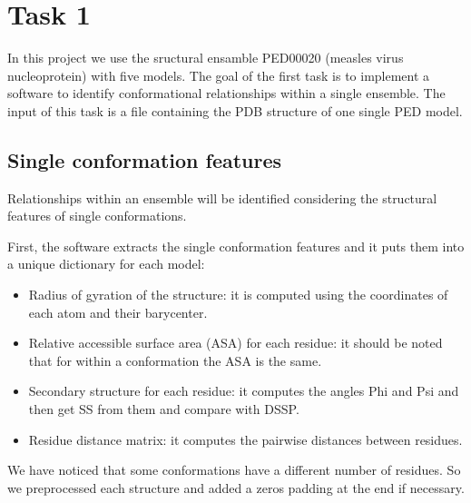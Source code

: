 \section{Task 1}\label{sec:task1}
\graphicspath{ {./figures/} }

In this project we use the sructural ensamble PED00020 (measles virus nucleoprotein) with five models.
The goal of the first task is to implement a software to identify conformational relationships within a single ensemble.  The input of this task is a file containing the PDB structure of one single PED model.


\subsection{Single conformation features}
Relationships within an ensemble will be identified considering the structural features of single conformations.

First, the software extracts the single conformation features and it puts them into a unique dictionary for each model:
\begin{itemize}
\item Radius of gyration of the structure: it is computed using the coordinates of each atom and their barycenter.
\item Relative accessible surface area (ASA) for each residue: it should be noted that for within a conformation the ASA is the same.
\item Secondary structure for each residue: it computes the angles Phi and Psi and then get SS from them and compare with DSSP.
\item Residue distance matrix: it computes the pairwise distances between residues.
\end{itemize}

We have noticed that some conformations have a different number of residues. So we preprocessed each structure and added a zeros padding at the end if necessary.


